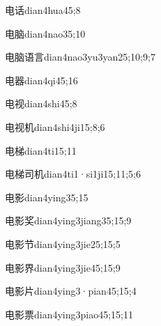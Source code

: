 \begin{verbete}{电话}{dian4hua4}{5;8}
\end{verbete}
\begin{verbete}{电脑}{dian4nao3}{5;10}
\end{verbete}
\begin{verbete}{电脑语言}{dian4nao3yu3yan2}{5;10;9;7}
\end{verbete}
\begin{verbete}{电器}{dian4qi4}{5;16}
\end{verbete}
\begin{verbete}{电视}{dian4shi4}{5;8}
\end{verbete}
\begin{verbete}{电视机}{dian4shi4ji1}{5;8;6}
\end{verbete}
\begin{verbete}{电梯}{dian4ti1}{5;11}
\end{verbete}
\begin{verbete}{电梯司机}{dian4ti1·si1ji1}{5;11;5;6}
\end{verbete}
\begin{verbete}{电影}{dian4ying3}{5;15}
\end{verbete}
\begin{verbete}{电影奖}{dian4ying3jiang3}{5;15;9}
\end{verbete}
\begin{verbete}{电影节}{dian4ying3jie2}{5;15;5}
\end{verbete}
\begin{verbete}{电影界}{dian4ying3jie4}{5;15;9}
\end{verbete}
\begin{verbete}{电影片}{dian4ying3·pian4}{5;15;4}
\end{verbete}
\begin{verbete}{电影票}{dian4ying3piao4}{5;15;11}
\end{verbete}
